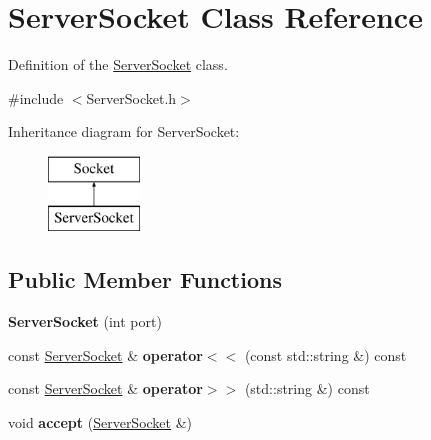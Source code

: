 \hypertarget{classServerSocket}{\section{Server\-Socket Class Reference}
\label{classServerSocket}
}


Definition of the \hyperlink{classServerSocket}{Server\-Socket} class.  




{\ttfamily \#include $<$Server\-Socket.\-h$>$}

Inheritance diagram for Server\-Socket\-:\begin{figure}[H]
\begin{center}
\leavevmode
\includegraphics[height=2.000000cm]{classServerSocket}
\end{center}
\end{figure}
\subsection*{Public Member Functions}
\begin{DoxyCompactItemize}
\item 
\hypertarget{classServerSocket_a3dc1a31f740e4a8d69ae10c5dcb547d6}{{\bfseries Server\-Socket} (int port)}\label{classServerSocket_a3dc1a31f740e4a8d69ae10c5dcb547d6}

\item 
\hypertarget{classServerSocket_ab5fe4b2d92d7014f7663c1bbacbbeda5}{const \hyperlink{classServerSocket}{Server\-Socket} \& {\bfseries operator$<$$<$} (const std\-::string \&) const }\label{classServerSocket_ab5fe4b2d92d7014f7663c1bbacbbeda5}

\item 
\hypertarget{classServerSocket_a6bfabf01766bdb2c7f53274d8d771212}{const \hyperlink{classServerSocket}{Server\-Socket} \& {\bfseries operator$>$$>$} (std\-::string \&) const }\label{classServerSocket_a6bfabf01766bdb2c7f53274d8d771212}

\item 
\hypertarget{classServerSocket_ae550e314a988575d05b1dec1c3c18020}{void {\bfseries accept} (\hyperlink{classServerSocket}{Server\-Socket} \&)}\label{classServerSocket_ae550e314a988575d05b1dec1c3c18020}

\end{DoxyCompactItemize}


